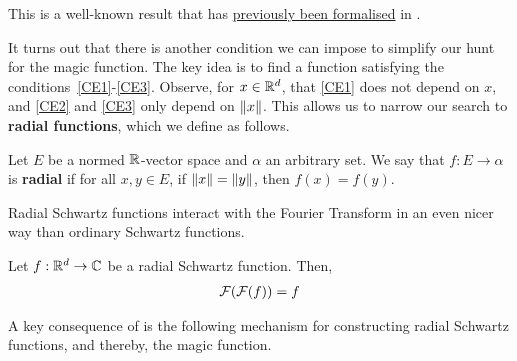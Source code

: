 This is a well-known result that has \href{https://github.com/leanprover-community/mathlib4/blob/bb076f5f2d39b534b917755b0338314b6714304b/Mathlib/Analysis/Distribution/FourierSchwartz.lean#L83-L101}{previously been formalised} in \mathlib.

It turns out that there is another condition we can impose to simplify our hunt for the magic function. The key idea is to find a function satisfying the conditions~\ref{CE1}-\ref{CE3}. Observe, for $x \in \mathbb{R}^d$, that \ref{CE1} does not depend on $x$, and \ref{CE2} and \ref{CE3} only depend on $\left\lVert x \right\rVert$. This allows us to narrow our search to \textbf{radial functions}, which we define as follows.

\begin{boxdefinition}
    Let $E$ be a normed $\mathbb{R}$-vector space and $\alpha$ an arbitrary set. We say that $f : E \to \alpha$ is \textbf{radial} if for all $x, y \in E$, if $\left\lVert x \right\rVert = \left\lVert y \right\rVert$, then $f(x) = f(y)$.
\end{boxdefinition}

Radial Schwartz functions interact with the Fourier Transform in an even nicer way than ordinary Schwartz functions.

\begin{boxproposition}\label{Ch3:Prop:RadialSchwartzFourier}
    Let $f : \mathbb{R}^d \to \mathbb{C}$ be a radial Schwartz function. Then,
    \begin{align*}
        \mathcal{F}\!\left( \mathcal{F}\!\left( f \right) \right) = f
    \end{align*}
\end{boxproposition}

A key consequence of  is the following mechanism for constructing radial Schwartz functions, and thereby, the magic function.

